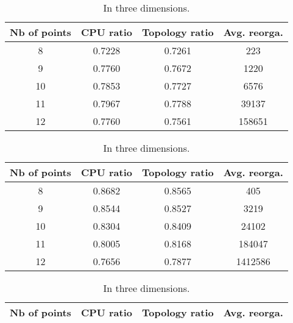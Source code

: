 \documentclass{article}
\theoremstyle{plain}
\begin{document}
\begin{table}	
	\caption{Comparison of performances on randomly generated instances.}\label{tab:results}
	\centering
\begin{footnotesize}
	\begin{subtable}[t]{\textwidth}
		\centering
		
		\begin{tabular}{c|c|c|c}
		Nb of points & CPU ratio & Topology ratio & Avg. reorga. \\
		\hline
		8 & 0.7228 & 0.7261 & 223\\

		9 & 0.7760 & 0.7672 & 1220\\

		10 & 0.7853 & 0.7727 & 6576\\

		11 & 0.7967 & 0.7788 & 39137\\

		12 & 0.7760 & 0.7561 & 158651\\
		\end{tabular}
		\caption{In two dimensions.}\label{tab:plane}
	\end{subtable}
	\newline
	
	\begin{subtable}[t]{\textwidth}
		\centering
		\begin{tabular}{c|c|c|c}
		Nb of points & CPU ratio & Topology ratio & Avg. reorga.\\
		\hline

		8 & 0.8682 & 0.8565 & 405\\

		9 & 0.8544 & 0.8527 & 3219\\

		10 & 0.8304 & 0.8409 & 24102\\

		11 & 0.8005 & 0.8168 & 184047\\

		12 & 0.7656 & 0.7877 & 1412586\\
		\end{tabular}
		\caption{In three dimensions.}\label{tab:space}
	\end{subtable}
	\newline
	
	\begin{subtable}[t]{\textwidth}
		\centering
		\begin{tabular}{c|c|c|c}
		{Nb of points} & CPU ratio & Topology ratio & Avg. reorga.\\
		\hline


\end{tabular}
\end{subtable}
\end{footnotesize}
\end{table}
\end{document}
